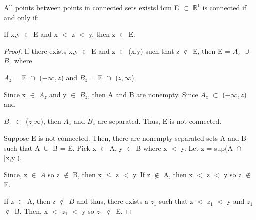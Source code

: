 	\vspace{0.5cm}



	\begin{wtheorem}{All points between points in connected sets exists}{14cm}
		E $\subset$ $\mathbb{R}^1$ is connected if and only if:

		\hspace{0.5cm}
		If x,y $\in$ E and x $<$ z $<$ y, then z $\in$ E.
	\end{wtheorem}
	
	\begin{proof}
		If there exists x,y $\in$ E and z $\in$ (x,y) such that z $\not \in$ E,
		then E = $A_z$ $\cup_{}^{}$ $B_z$ where
		
		$A_z$ = E $\cap_{}^{}$ ($-\infty,z$)
		and $B_z$ = E $\cap_{}^{}$ ($z,\infty$).

		Since x $\in$ $A_z$ and y $\in$ $B_z$, then A and B are nonempty.
		Since $A_z$ $\subset$ ($-\infty,z$) and
		
		$B_z$ $\subset$ ($z_,\infty$),
		then $A_z$ and $B_z$ are separated. Thus, E is not connected.

		\vspace{0.2cm}

		Suppose E is not connected. Then, there are nonempty separated sets
		A and B such that A $\cup_{}^{}$ B = E. Pick x $\in$ A, y $\in$ B
		where x $<$ y. Let z = sup(A $\cap_{}^{}$ [x,y]).

		Since, z $\in$ $\overline{A}$ so z $\not \in$ B, then x $\leq$ z $<$ y.
		If z $\not \in$ A, then x $<$ z $<$ y so z $\not \in$ E.

		If z $\in$ A, then z $\not \in$ $\overline{B}$ and thus,
		there exists a $z_1$ such that z $<$ $z_1$ $<$ y and $z_1$ $\not \in$ B.
		Then, x $<$ $z_1$ $<$ y so $z_1$ $\not \in$ E.
	\end{proof}




